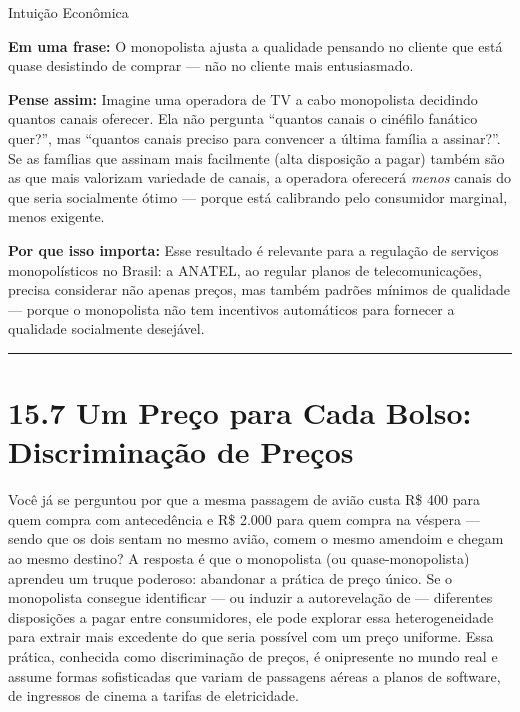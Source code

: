 \documentclass[11pt,twoside,openright]{book}
\begin{document}
\begin{intuitionbox}{Intuição Econômica}

\textbf{Em uma frase:} O monopolista ajusta a qualidade pensando no
cliente que está quase desistindo de comprar --- não no cliente mais
entusiasmado.

\textbf{Pense assim:} Imagine uma operadora de TV a cabo monopolista
decidindo quantos canais oferecer. Ela não pergunta ``quantos canais o
cinéfilo fanático quer?'', mas ``quantos canais preciso para convencer a
última família a assinar?''. Se as famílias que assinam mais facilmente
(alta disposição a pagar) também são as que mais valorizam variedade de
canais, a operadora oferecerá \emph{menos} canais do que seria
socialmente ótimo --- porque está calibrando pelo consumidor marginal,
menos exigente.

\textbf{Por que isso importa:} Esse resultado é relevante para a
regulação de serviços monopolísticos no Brasil: a ANATEL, ao regular
planos de telecomunicações, precisa considerar não apenas preços, mas
também padrões mínimos de qualidade --- porque o monopolista não tem
incentivos automáticos para fornecer a qualidade socialmente desejável.

\end{intuitionbox}

\begin{center}\rule{0.5\linewidth}{0.5pt}\end{center}

\section{15.7 Um Preço para Cada Bolso: Discriminação de
Preços}\label{157}

Você já se perguntou por que a mesma passagem de avião custa R\$ 400
para quem compra com antecedência e R\$ 2.000 para quem compra na
véspera --- sendo que os dois sentam no mesmo avião, comem o mesmo
amendoim e chegam ao mesmo destino? A resposta é que o monopolista (ou
quase-monopolista) aprendeu um truque poderoso: abandonar a prática de
preço único. Se o monopolista consegue identificar --- ou induzir a
autorevelação de --- diferentes disposições a pagar entre consumidores,
ele pode explorar essa heterogeneidade para extrair mais excedente do
que seria possível com um preço uniforme. Essa prática, conhecida como
discriminação de preços, é onipresente no mundo real e assume formas
sofisticadas que variam de passagens aéreas a planos de software, de
ingressos de cinema a tarifas de eletricidade.
\end{document}

